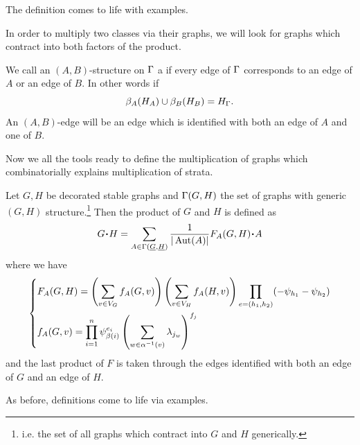 \documentclass[12pt]{memoir}
\begin{document}
The definition comes to life with examples.

\begin{Ex}
\end{Ex}

In order to multiply two classes via their graphs, we will look for graphs which contract into both factors of the product. 

\begin{Def}
    We call an $(A,B)$-structure on $\Gamma$ a  if every edge of $\Gamma$ corresponds to an edge of $A$ or an edge of $B$. In other words if 
    $$\beta_A(H_A)\cup\beta_B(H_B)=H_\Gamma.$$
    An $(A,B)$-edge will be an edge which is identified with both an edge of $A$ and one of $B$.
\end{Def}

Now we all the tools ready to define the multiplication of graphs which combinatorially explains multiplication of strata.

\begin{Def}
    Let $G,H$ be decorated stable graphs and $\Gamma(G,H)$ the set of graphs with generic $(G,H)$ structure.\footnote{i.e. the set of all graphs which contract into $G$ and $H$ generically.} Then the product of $G$ and $H$ is defined as 
    $$G\. H=\sum_{A\in\Ga(\un G,\un H)}\frac{1}{|\Aut(A)|}F_A(G,H)\.A$$
    where we have 
    $$
    \left\lbrace
    \begin{aligned}
        &F_A(G,H)=\left(\sum_{v\in V_G}f_A(G,v)\right)\left(\sum_{v\in V_H}f_A(H,v)\right)\prod_{e=(h_1,h_2)}(-\psi_{h_1}-\psi_{h_2})\\
        &f_A(G,v)=\prod_{i=1}^{n}\psi_{\beta(i)}^{e_i}\left(\sum_{w\in\alpha^{-1}(v)}\lambda_{j_w}\right)^{f_j}
    \end{aligned}
    \right.
    $$
    and the last product of $F$ is taken through the edges identified with both an edge of $G$ and an edge of $H$.
\end{Def}

As before, definitions come to life via examples. 
\end{document}
